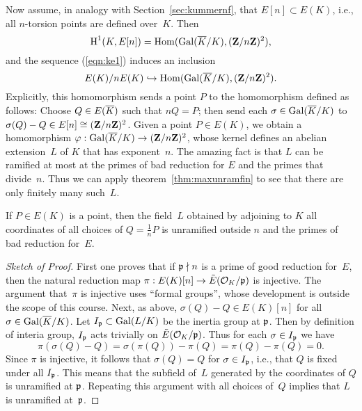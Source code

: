 Now assume, in analogy with Section~\ref{sec:kummernf}, that
$E[n]\subset E(K)$, i.e., all $n$-torsion points are defined over~$K$.
Then 
$$\operatorname{H}^1(K,E[n]) = \operatorname{Hom}(\operatorname{Gal}(\overline{K}/K),(\mathbf{Z}/n\mathbf{Z})^2),$$
and the sequence (\ref{eqn:ke1})
induces an inclusion
\begin{equation}\label{eqn:injmw}
  E(K)/n E(K) \hookrightarrow \operatorname{Hom}(\operatorname{Gal}(\overline{K}/K),(\mathbf{Z}/n\mathbf{Z})^2).
\end{equation}
Explicitly, this homomorphism sends a point $P$ to the homomorphism
defined as follows: Choose $Q \in E(\overline{K})$ such that $nQ = P$; then
send each $\sigma \in \operatorname{Gal}(\overline{K}/K)$ to $\sigma(Q)-Q\in E[n]\cong
(\mathbf{Z}/n\mathbf{Z})^2$.  Given a point $P\in E(K)$, we obtain a homomorphism
$\varphi : \operatorname{Gal}(\overline{K}/K) \to (\mathbf{Z}/n\mathbf{Z})^2$, whose kernel defines an
abelian extension~$L$ of $K$ that has exponent~$n$. 
The amazing fact is that $L$ can be ramified at most at the primes
of bad reduction for $E$ and the primes that divide~$n$.  
Thus we can apply theorem~\ref{thm:maxunramfin} to see that there are
only finitely many such~$L$.

\begin{theorem}\label{thm:mwunram}
  If $P\in E(K)$ is a point, then the field~$L$ obtained by adjoining to $K$
  all coordinates of all choices of $Q=\frac{1}{n}P$ is unramified
  outside $n$ and the primes of bad reduction for~$E$.
\end{theorem}
\begin{proof}[Sketch of Proof]
  First one proves that if $\mathfrak{p} \nmid n$ is a prime of good reduction
  for~$E$, then the natural reduction map $\pi: E(K)[n] \to
  \tilde{E}(\mathcal{O}_K/\mathfrak{p})$ is injective.  The argument that~$\pi$ is
  injective uses ``formal groups'', whose development is outside the
  scope of this course.  Next, as above, $\sigma(Q)-Q \in E(K)[n]$ for
  all $\sigma \in \operatorname{Gal}(\overline{K}/K)$.  Let $I_{\mathfrak{p}}\subset \operatorname{Gal}(L/K)$ be the
  inertia group at $\mathfrak{p}$.  Then by definition of interia group, $I_{\mathfrak{p}}$
  acts trivially on $\tilde{E}(\mathcal{O}_K/\mathfrak{p})$.  Thus for each $\sigma \in
  I_{\mathfrak{p}}$ we have
$$
  \pi(\sigma(Q) - Q) = \sigma(\pi(Q)) - \pi(Q) = \pi(Q) - \pi(Q) = 0.
$$
Since $\pi$ is injective, it follows that $\sigma(Q) = Q$ for $\sigma\in I_{\mathfrak{p}}$,
i.e., that $Q$ is fixed under all $I_{\mathfrak{p}}$.  This means that the subfield
of~$L$ generated by the coordinates of $Q$ is unramified at $\mathfrak{p}$.
Repeating this argument with all choices of~$Q$ implies that $L$
is unramified at~$\mathfrak{p}$.
\end{proof}


